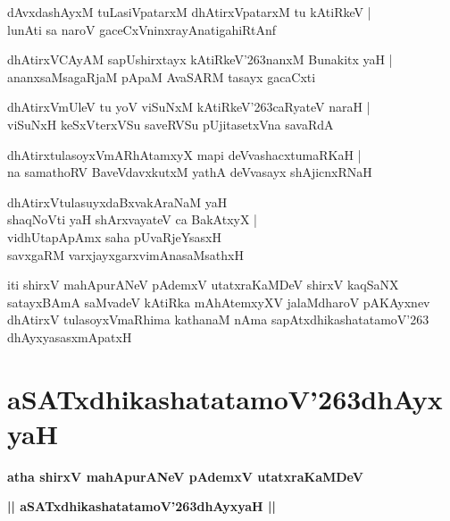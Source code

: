 \documentclass[twoside,12pt,openright]{book}
\def\S{\char'263}
\newcounter{shloka}[chapter]
\begin{document}
\begin{shloka}%
dAvxdashAyxM tuLasiVpatarxM dhAtirxVpatarxM tu kAtiRkeV |\\
lunAti sa naroV gaceCxVninxrayAnatigahiRtAnf 
\end{shloka}

\begin{shloka}%
dhAtirxVCAyAM sapUshirxtayx kAtiRkeV\S nanxM Bunakitx yaH |\\
ananxsaMsagaRjaM  pApaM AvaSARM tasayx gacaCxti 
\end{shloka}

\begin{shloka}%
dhAtirxVmUleV tu yoV viSuNxM kAtiRkeV\S caRyateV naraH |\\
viSuNxH keSxVterxVSu saveRVSu pUjitasetxVna savaRdA 
\end{shloka}

\begin{shloka}%
dhAtirxtulasoyxVmARhAtamxyX mapi deVvashacxtumaRKaH |\\
na samathoRV BaveVdavxkutxM yathA deVvasayx shAjicnxRNaH 
\end{shloka}

\begin{shloka}%
dhAtirxVtulasuyxdaBxvakAraNaM yaH \\
shaqNoVti yaH shArxvayateV ca BakAtxyX |\\
vidhUtapApAmx saha pUvaRjeYsasxH \\
savxgaRM varxjayxgarxvimAnasaMsathxH 
\end{shloka}

\begin{center}
iti shirxV mahApurANeV pAdemxV utatxraKaMDeV shirxV kaqSaNX satayxBAmA saMvadeV kAtiRka 
mAhAtemxyXV jalaMdharoV pAKAyxnev dhAtirxV tulasoyxVmaRhima kathanaM nAma sapAtxdhikashatatamoV\S 
dhAyxyasasxmApatxH 
\end{center}

\chapter{aSATxdhikashatatamoV\S dhAyxyaH}

\begin{center}
{\LARGE\bfseries atha shirxV mahApurANeV pAdemxV utatxraKaMDeV}
\end{center}

\begin{center}
{\LARGE\bfseries || aSATxdhikashatatamoV\S dhAyxyaH || }
\end{center}
\end{document}

